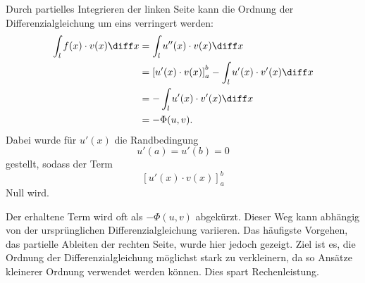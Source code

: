 Durch partielles Integrieren der linken Seite kann die Ordnung der Differenzialgleichung um eins verringert werden:
\begin{align}
    \int_l f(x) \cdot v(x) \diff x &= \int_l u''(x) \cdot v(x) \diff x \\
                                 &= \left[ u'(x) \cdot v(x) \right]_{a}^{b} - \int_l u'(x) \cdot v'(x) \diff x \\
                                 &= - \int_l u'(x) \cdot v'(x) \diff x \\
                                 &= - \Phi(u, v).
\end{align}
Dabei wurde für $u'(x)$ die Randbedingung
\begin{equation}
    u'(a) = u'(b) = 0
\end{equation}
gestellt, sodass der Term
\begin{equation}
    \left[ u'(x) \cdot v(x) \right]_{a}^{b}
\end{equation}
Null wird.

Der erhaltene Term wird oft als $-\Phi(u, v)$ abgekürzt.
Dieser Weg kann abhängig von der ursprünglichen Differenzialgleichung variieren.
Das häufigste Vorgehen, das partielle Ableiten der rechten Seite, wurde hier jedoch gezeigt.
Ziel ist es, die Ordnung der Differenzialgleichung möglichst stark zu verkleinern, da so Ansätze kleinerer Ordnung verwendet werden können.
Dies spart Rechenleistung.


